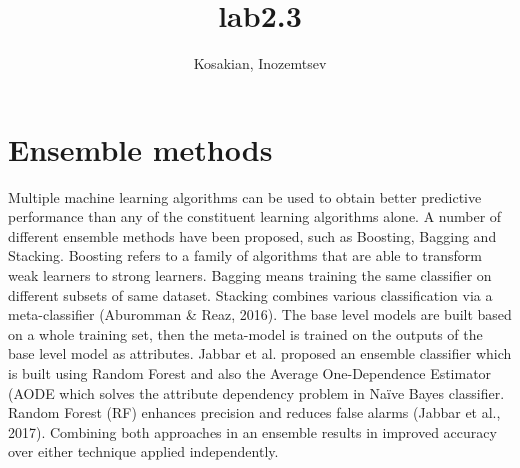 \documentclass[12pt]{acmart}
\begin{document}
\begin{titlepage}
\title{lab2.3}
\author{Kosakian, Inozemtsev}
\date{}
\maketitle %
\thispagestyle{empty}
\end{titlepage}

\tableofcontents
\newpage




\section{Ensemble methods}
    Multiple machine learning algorithms can be used to obtain better predictive performance than any of the constituent learning algorithms alone. A number of different ensemble methods have been proposed, such as Boosting, Bagging and Stacking.
    Boosting refers to a family of algorithms that are able to transform weak learners to strong learners. Bagging means training the same classifier on different subsets of same dataset. Stacking combines various classification via a meta-classifier (Aburomman \& Reaz, 2016). The base level models are built based on a whole training set, then the meta-model is trained on the outputs of the base level model as attributes.
    Jabbar et al. proposed an ensemble classifier which is built using Random Forest and also the Average One-Dependence Estimator (AODE which solves the attribute dependency problem in Naïve Bayes classifier. Random Forest (RF) enhances precision and reduces false alarms (Jabbar et al., 2017). Combining both approaches in an ensemble results in improved accuracy over either technique applied independently.
\end{document}
